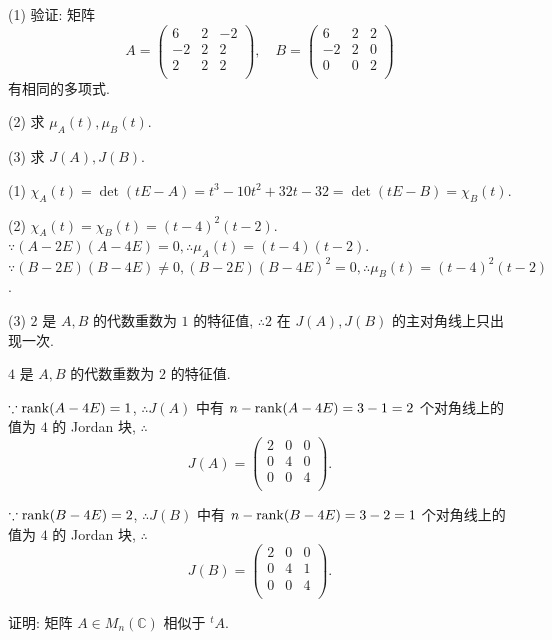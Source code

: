 \documentclass[color=black,device=normal,lang=cn,mode=geye]{elegantnote}
\begin{document}
\begin{exercise}%
    (1) 验证: 矩阵
    \[A=\begin{pmatrix}
        6 & 2 & -2 \\
        -2 & 2 & 2 \\
        2 & 2 & 2 \\
    \end{pmatrix},\quad B=\begin{pmatrix}
        6 & 2 & 2 \\
        -2 & 2 & 0 \\
        0 & 0 & 2 \\
    \end{pmatrix}\]
    有相同的多项式.

    (2) 求 $\mu_A(t),\mu_B(t)$.

    (3) 求 $J(A),J(B)$.
\end{exercise}
\begin{solution}
    (1) $\chi_A(t)=\det(tE-A)=t^3-10t^2+32t-32=\det(tE-B)=\chi_B(t)$.

    (2) $\chi_A(t)=\chi_B(t)=(t-4)^2(t-2)$. $\because(A-2E)(A-4E)=0,\therefore\mu_A(t)=(t-4)(t-2)$. $\because(B-2E)(B-4E)\neq0,(B-2E)(B-4E)^2=0,\therefore\mu_B(t)=(t-4)^2(t-2)$.

    (3) $2$ 是 $A,B$ 的代数重数为 $1$ 的特征值, $\therefore2$ 在 $J(A),J(B)$ 的主对角线上只出现一次.

    $4$ 是 $A,B$ 的代数重数为 $2$ 的特征值.

    $\because\operatorname{rank} (A-4E)=1$, $\therefore J(A)$ 中有 $n-\operatorname{rank} (A-4E)=3-1=2$ 个对角线上的值为 $4$ 的 Jordan 块, $\therefore$
    \[J(A)=\begin{pmatrix}
        2 & 0 & 0 \\
        0 & 4 & 0 \\
        0 & 0 & 4 \\
    \end{pmatrix}.\]

    $\because\operatorname{rank} (B-4E)=2$, $\therefore J(B)$ 中有 $n-\operatorname{rank} (B-4E)=3-2=1$ 个对角线上的值为 $4$ 的 Jordan 块, $\therefore$
    \[J(B)=\begin{pmatrix}
        2 & 0 & 0 \\
        0 & 4 & 1 \\
        0 & 0 & 4 \\
    \end{pmatrix}.\]
\end{solution}
\begin{exercise}%
    证明: 矩阵 $A\in M_n(\mathbb{C})$ 相似于 $^tA$.
\end{exercise}
\end{document}
